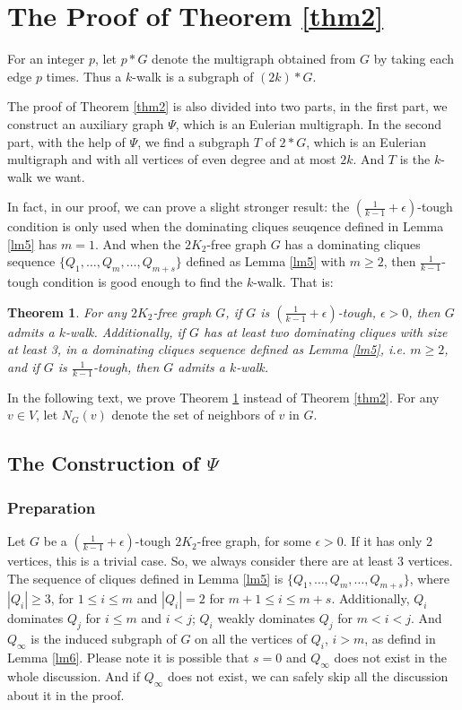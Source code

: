 \documentclass{amsart}
\newtheorem{theorem}{Theorem}
\begin{document}
\section{The Proof of Theorem \ref{thm2}}

For an integer $p$, let $p*G$ denote the multigraph obtained from $G$ by taking each edge $p$ times. 
Thus a $k$-walk is a subgraph of $(2k)*G$. 

The proof of Theorem \ref{thm2} is also divided into two parts, in the first part, we construct an auxiliary graph $\Psi$, which is an Eulerian multigraph. In the second part, with the help of $\Psi$, we find a subgraph $T$ of $2*G$, which is an Eulerian multigraph and with all vertices of even degree and at most $2k$. And $T$ is the $k$-walk we want.

In fact, in our proof, we can prove a slight stronger result: the $(\frac{1}{k-1}+\epsilon)$-tough condition is only used when the dominating cliques seuqence defined in Lemma \ref{lm5} has $m=1$. And when the $2K_2$-free graph $G$ has a dominating cliques sequence $\{Q_1,\ldots,Q_m,\ldots,Q_{m+s}\}$ defined as Lemma \ref{lm5} with $m\ge2$, then $\frac{1}{k-1}$-tough condition is good enough to find the $k$-walk. That is:
\begin{theorem}\label{opt}
For any $2K_2$-free graph $G$, if $G$ is $(\frac{1}{k-1}+\epsilon)$-tough, $\epsilon>0$, then $G$ admits a $k$-walk. Additionally, if $G$ has at least two dominating cliques with size at least 3, in a dominating cliques sequence defined as Lemma \ref{lm5}, i.e. $m\ge2$, and if $G$ is $\frac{1}{k-1}$-tough, then $G$ admits a $k$-walk.
\end{theorem}
In the following text, we prove Theorem \ref{opt} instead of Theorem \ref{thm2}.
For any $v\in V$, let 
$N_G(v)$ denote the set of neighbors of $v$ in $G$. 


\subsection{The Construction of $\Psi$}

\subsubsection{Preparation}

Let $G$ be a $(\frac{1}{k-1}+\epsilon)$-tough $2K_2$-free graph, for some $\epsilon>0$. If it has only 2 vertices, this is a trivial case. So, we always consider there are at least 3 vertices. The sequence of cliques defined in Lemma \ref{lm5} is $\{Q_1,\ldots,Q_m,\ldots,Q_{m+s}\}$, where $|Q_i|\ge3$, for $1\le i\le m$ and $|Q_i|=2$ for $m+1\le i\le m+s$. Additionally, $Q_i$ dominates $Q_j$ for $i\le m$ and $i<j$; $Q_i$ weakly dominates $Q_j$ for $m<i<j$. And $Q_{\infty}$ is the induced subgraph of $G$ on all the vertices of $Q_i$, $i>m$, as defind in Lemma \ref{lm6}. Please note it is possible that $s=0$ and $Q_{\infty}$ does not exist in the whole discussion. And if $Q_{\infty}$ does not exist, we can safely skip all the discussion about it in the proof.
\end{document}
